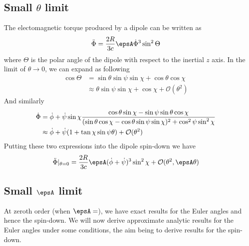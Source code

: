 \documentclass[/home/greg/Thesis/main/main.tex]{subfiles}
\begin{document}
\subsection{Small $\theta$ limit}
The electomagnetic torque produced by a dipole can be written as 
\begin{equation}
\Phiddot = \frac{2R}{3c}\epsA \Phidot^{3} \sin^{2}\Theta
\end{equation}
where $\Theta$ is the polar angle of the dipole with respect to the inertial
$z$ axis. In the limit of $\theta \rightarrow 0$, we can expand as following
\begin{align}
\cos\Theta &= \sin\theta \sin\psi \sin\chi + \cos\theta \cos \chi \\
& \approx \theta\sin\psi \sin\chi  + \cos\chi + \mathcal{O}(\theta^{2})
\end{align}
And similarly 
\begin{align}
\dot{\Phi} &= \dot{\phi} + \dot{\psi} \sin\chi 
\frac{\cos\theta \sin\chi - \sin\psi \sin \theta \cos \chi}
{(\sin\theta\cos\chi - \cos\theta \sin \psi \sin \chi)^{2} + \cos^{2}\psi \sin^{2}\chi}
\\
& \approx \dot{\phi} + \dot{\psi} (1 + \tan\chi \sin\psi \theta) + \mathcal{O}(\theta^{2})
\end{align}
Putting these two expressions into the dipole spin-down we have
\begin{equation}
\Phiddot |_{\theta=0} = \frac{2R}{3c} \epsA (\dot{\phi} + \dot{\psi})^{3} \sin^{2}\chi 
+ \mathcal{O}(\theta^{2}, \epsA \theta)
\end{equation}


\subsection{Small $\epsA$ limit}
At zeroth order (when $\epsA=$),  we have exact results for the Euler angles
and hence the spin-down. We will now derive approximate analytic results for
the Euler angles under some conditions, the aim being to derive results for the
spin-down.
\end{document}
